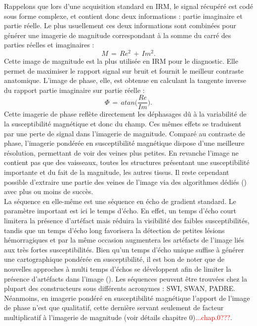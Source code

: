 Rappelons que lors d’une acquisition standard en IRM, le signal récupéré est codé sous forme complexe, et contient donc deux informations : partie imaginaire et partie réelle. Le plus usuellement ces deux informations sont combinées pour générer une imagerie de magnitude correspondant à la somme du carré des parties réelles et imaginaires :
\begin{equation}
M\,=\,Re^2\,+\,Im^2.
\end{equation}
Cette image de magnitude est la plus utilisée en IRM pour le diagnostic. Elle permet de maximiser le rapport signal sur bruit et fournit le meilleur contraste anatomique. L’image de phase, elle, est obtenue en calculant la tangente inverse du rapport partie imaginaire sur partie réelle :
\begin{equation}
\Phi\,=\,atan\biggl(\frac{Re}{Im}\biggr).
\end{equation}
Cette imagerie de phase reflète directement les déphasages dû à la variabilité de la susceptibilité magnétique et donc du champ. Ces mêmes effets se traduisent par une perte de signal dans l’imagerie de magnitude. Comparé au contraste de phase, l’imagerie pondérée en susceptibilité magnétique dispose d’une meilleure résolution, permettant de voir des veines plus petites. En revanche l’image ne contient pas que des vaisseaux, toutes les structures présentant une susceptibilité importante et du fait de la magnitude, les autres tissus. Il reste cependant possible d’extraire une partie des veines de l’image via des algorithmes dédiés (\cite{Manniesing2006}) avec plus ou moins de succès.\\
La séquence en elle-même est une séquence en écho de gradient standard. Le paramètre important est ici le temps d’écho. En effet, un temps d’écho court limitera la présence d’artéfact mais réduira la visibilité des faibles susceptibilités, tandis que un temps d’écho long favorisera la détection de petites lésions hémorragiques et par la même occasion augmentera les artéfacts de l’image liés aux très fortes susceptibilités. Bien qu’un temps d’écho unique suffise à générer une cartographique pondérée en susceptibilité, il est bon de noter que de nouvelles approches à multi temps d’échos se développent afin de limiter la présence d’artéfacts dans l’image (\cite{Oh2013}). Les séquences peuvent être trouvées chez la plupart des constructeurs sous différents acronymes : SWI, SWAN, PADRE.\\
Néanmoins, en imagerie pondéré en susceptibilité magnétique l’apport de l’image de phase n’est que qualitatif, cette dernière servant seulement de facteur multiplicatif à l’imagerie de magnitude (voir détails chapitre 0)\textcolor{red}{...chap.0???}.\\
